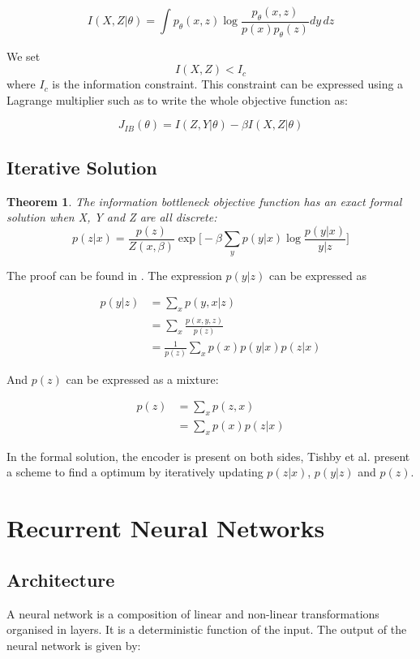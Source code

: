 \documentclass[11pt,oneside,openright]{report}
\newtheorem{theorem}{Theorem}
\begin{document}
$$ I(X, Z|\theta) = \int p_\theta(x, z) \log \frac{p_\theta(x, z)}{p(x)p_\theta(z)} dy\,dz $$

We set $$I(X, Z) < I_c$$ where $I_c$ is the information constraint. This constraint can be expressed using a Lagrange multiplier such as to write the whole objective function as:

$$ J_{IB}(\theta) = I(Z, Y|\theta) - \beta I(X, Z|\theta)$$


\subsection{Iterative Solution}
\begin{theorem}
The information bottleneck objective function has an exact formal solution when X, Y and Z are all discrete:
$$ p(z|x) = \frac{p(z)}{Z(x, \beta)} \exp\Big[-\beta \sum_y p(y|x) \log\frac{p(y|x)}{y|z}\Big] $$
\end{theorem}

The proof can be found in \cite{tishby}. The expression $p(y|z)$ can be expressed as 
 
 \begin{align}
p(y|z) &= \sum_x p(y, x|z)  \\
	 & = \sum_x \frac{p(x ,y, z)}{p(z)} \\
	 &= \frac{1}{p(z)} \sum_x p(x) p(y|x) p (z|x) 
\label{eq:y_given_z}
\end{align}

And $p(z)$ can be expressed as a mixture:
 
  \begin{align}
p(z) &= \sum_x p(z, x)  \\
	 &= \sum_x p(x) p(z|x)
\label{eq:z_post}
\end{align}

In the formal solution, the encoder is present on both sides, Tishby et al. present a scheme to find a optimum by iteratively updating $p(z|x)$, $p(y|z)$ and $p(z)$.

\section{Recurrent Neural Networks}

\subsection{Architecture}
A neural network is a composition of linear and non-linear transformations organised in layers. It is a deterministic function of the input. The output of the neural network is given by:
\end{document}
